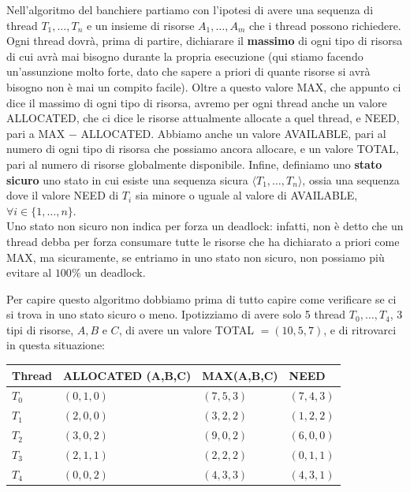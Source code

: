 \documentclass[11pt, a4paper, titlepage, oneside]{scrbook}
\begin{document}
Nell'algoritmo del banchiere partiamo con l'ipotesi di avere una sequenza di thread $T_1, \ldots, T_n$ e un insieme di risorse $A_1, \ldots, A_m$ che i thread possono richiedere. Ogni thread dovrà, prima di partire, dichiarare il \textbf{massimo} di ogni tipo di risorsa di cui avrà mai bisogno durante la propria esecuzione (\NB qui stiamo facendo un'assunzione molto forte, dato che sapere a priori di quante risorse si avrà bisogno non è mai un compito facile). Oltre a questo valore MAX, che appunto ci dice il massimo di ogni tipo di risorsa, avremo per ogni thread anche un valore ALLOCATED, che ci dice le risorse attualmente allocate a quel thread, e NEED, pari a MAX $-$ ALLOCATED. Abbiamo anche un valore AVAILABLE, pari al numero di ogni tipo di risorsa che possiamo ancora allocare, e un valore TOTAL, pari al numero di risorse globalmente disponibile. Infine, definiamo uno \textbf{stato sicuro} uno stato in cui esiste una sequenza sicura $\langle T_1, \ldots, T_n \rangle$, ossia una sequenza dove il valore NEED di $T_i$ sia minore o uguale al valore di AVAILABLE, $\forall i \in \{1, \ldots, n\}$. \\
\NB Uno stato non sicuro non indica per forza un deadlock: infatti, non è detto che un thread debba per forza consumare tutte le risorse che ha dichiarato a priori come MAX, ma sicuramente, se entriamo in uno stato non sicuro, non possiamo più evitare al $100\%$ un deadlock.

Per capire questo algoritmo dobbiamo prima di tutto capire come verificare se ci si trova in uno stato sicuro o meno. Ipotizziamo di avere solo 5 thread $T_0, \ldots, T_4$, 3 tipi di risorse, $A,B$ e $C$, di avere un valore TOTAL $= (10,5,7)$, e di ritrovarci in questa situazione:

\begin{center}
\begin{tabular}{|l|l|l|l|}
\hline
\textbf{Thread} & \textbf{ALLOCATED (A,B,C)} & \textbf{MAX(A,B,C)} & \textbf{NEED}   \\ \hline
$T_0$ & $(0,1,0)$ & $(7,5,3)$ & $(7,4,3)$ \\ 
$T_1$ & $(2,0,0)$ & $(3,2,2)$ & $(1,2,2)$ \\ 
$T_2$ & $(3,0,2)$ & $(9,0,2)$ & $(6,0,0)$ \\ 
$T_3$ & $(2,1,1)$ & $(2,2,2)$ & $(0,1,1)$ \\ 
$T_4$ & $(0,0,2)$ & $(4,3,3)$ & $(4,3,1)$ \\ \hline 
\end{tabular}
\end{center}
\end{document}

